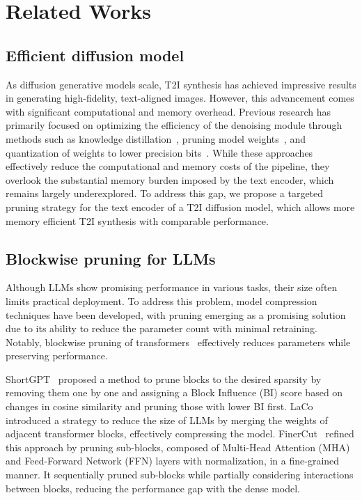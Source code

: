 \section{Related Works}
\label{related_works}
\subsection{Efficient diffusion model}
As diffusion generative models scale, T2I synthesis has achieved impressive results in generating high-fidelity, text-aligned images. However, this advancement comes with significant computational and memory overhead. Previous research has primarily focused on optimizing the efficiency of the denoising module through methods such as knowledge distillation~\cite{li2024snapfusion, song2024multi, castells2024edgefusion, zhao2025mobilediffusion, kim2025bk}, pruning model weights~\cite{fang2023structural, ganjdanesh2024not, wang2024patch, castells2024ld, lee2024dit}, and quantization of weights to lower precision bits~\cite{li2023q, he2024ptqd, li2024svdqunat, wang2024quest, ryu2025dgq}. While these approaches effectively reduce the computational and memory costs of the pipeline, they overlook the substantial memory burden imposed by the text encoder, which remains largely underexplored. To address this gap, we propose a targeted pruning strategy for the text encoder of a T2I diffusion model, which allows more memory efficient T2I synthesis with comparable performance.

\subsection{Blockwise pruning for LLMs}
Although LLMs show promising performance in various tasks, their size often limits practical deployment. To address this problem, model compression techniques have been developed, with pruning emerging as a promising solution due to its ability to reduce the parameter count with minimal retraining. Notably, blockwise pruning of transformers~\cite{men2024shortgpt, yang2024laco, zhang2024finercut} effectively reduces parameters while preserving performance.

ShortGPT~\cite{men2024shortgpt} proposed a method to prune blocks to the desired sparsity by removing them one by one and assigning a Block Influence (BI) score based on changes in cosine similarity and pruning those with lower BI first. LaCo~\cite{yang2024laco} introduced a strategy to reduce the size of LLMs by merging the weights of adjacent transformer blocks, effectively compressing the model. FinerCut~\cite{zhang2024finercut} refined this approach by pruning sub-blocks, composed of Multi-Head Attention (MHA) and Feed-Forward Network (FFN) layers with normalization, in a fine-grained manner. It sequentially pruned sub-blocks while partially considering interactions between blocks, %
reducing the performance gap with the dense model.


